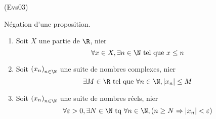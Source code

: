 \begin{tiny}(Evs03)\end{tiny} Négation d'une proposition.
\begin{enumerate}
  \item Soit $X$ une partie de $\R$, nier
\begin{displaymath}
  \forall x \in X, \exists n\in \N \text{ tel que } x\leq n
\end{displaymath}
  \item Soit $\left( x_n\right)_{n\in \N}$ une suite de nombres complexes, nier
\begin{displaymath}
  \exists M\in \R \text{ tel que } \forall n \in \N, |x_n|\leq M
\end{displaymath}
  \item Soit $\left( x_n\right)_{n\in \N}$ une suite de nombres réels, nier
\begin{displaymath}
  \forall \varepsilon >0 , \exists N\in \N \text{ tq } \forall n \in \N, \left( n\geq N \Rightarrow |x_n| < \varepsilon\right) 
\end{displaymath}
  
\end{enumerate}

